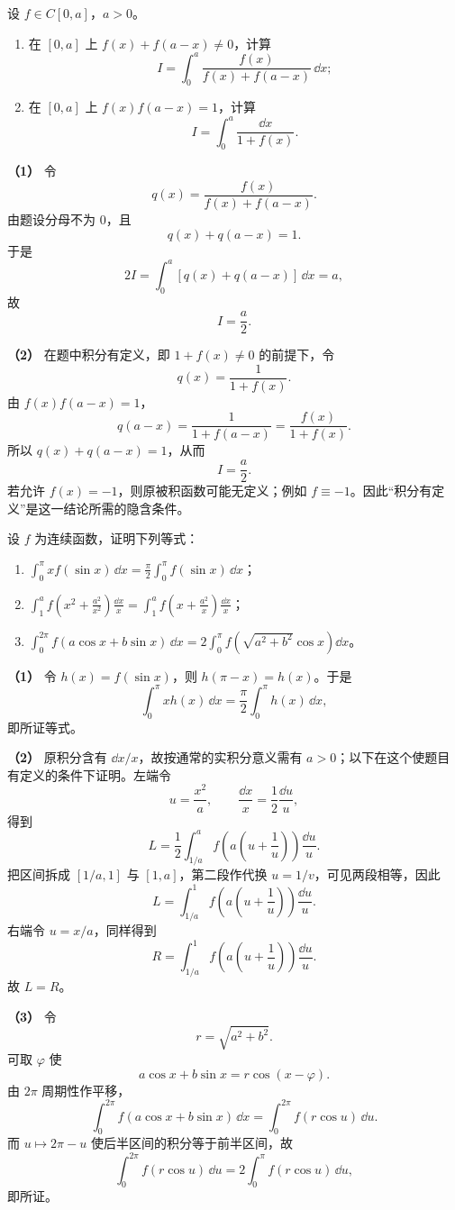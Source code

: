 \begin{xexercise}[4]
设 $f\in C[0,a]$，$a>0$。
\begin{enumerate}[label=(\arabic*)]
  \item 在 $[0,a]$ 上 $f(x)+f(a-x)\ne0$，计算
  \[
    I=\int_0^a\frac{f(x)}{f(x)+f(a-x)}\,\dd x;
  \]
  \item 在 $[0,a]$ 上 $f(x)f(a-x)=1$，计算
  \[
    I=\int_0^a\frac{\dd x}{1+f(x)}.
  \]
\end{enumerate}
\end{xexercise}
\begin{xsolution}
\textbf{（1）}\quad
令
\[
  q(x)=\frac{f(x)}{f(x)+f(a-x)}.
\]
由题设分母不为 $0$，且
\[
  q(x)+q(a-x)=1.
\]
于是
\[
  2I=\int_0^a[q(x)+q(a-x)]\,\dd x=a,
\]
故
\[
  \boxed{I=\frac a2}.
\]

\textbf{（2）}\quad
在题中积分有定义，即 $1+f(x)\ne0$ 的前提下，令
\[
  q(x)=\frac1{1+f(x)}.
\]
由 $f(x)f(a-x)=1$，
\[
  q(a-x)=\frac1{1+f(a-x)}
  =\frac{f(x)}{1+f(x)}.
\]
所以 $q(x)+q(a-x)=1$，从而
\[
  \boxed{I=\frac a2}.
\]
若允许 $f(x)=-1$，则原被积函数可能无定义；例如 $f\equiv-1$。因此“积分有定义”是这一结论所需的隐含条件。
\end{xsolution}


\begin{xexercise}[5]
设 $f$ 为连续函数，证明下列等式：
\begin{enumerate}[label=(\arabic*)]
  \item $\displaystyle\int_0^\pi x f(\sin x)\,\dd x=\frac\pi2\int_0^\pi f(\sin x)\,\dd x$；
  \item $\displaystyle\int_1^a f\left(x^2+\frac{a^2}{x^2}\right)\frac{\dd x}{x}=\int_1^a f\left(x+\frac{a^2}{x}\right)\frac{\dd x}{x}$；
  \item $\displaystyle\int_0^{2\pi}f(a\cos x+b\sin x)\,\dd x=2\int_0^\pi f\left(\sqrt{a^2+b^2}\cos x\right)\dd x$。
\end{enumerate}
\end{xexercise}
\begin{xsolution}
\textbf{（1）}\quad
令 $h(x)=f(\sin x)$，则 $h(\pi-x)=h(x)$。于是
\[
  \int_0^\pi xh(x)\,\dd x
  =\frac\pi2\int_0^\pi h(x)\,\dd x,
\]
即所证等式。

\textbf{（2）}\quad
原积分含有 $\dd x/x$，故按通常的实积分意义需有 $a>0$；以下在这个使题目有定义的条件下证明。左端令
\[
  u=\frac{x^2}{a},
  \qquad
  \frac{\dd x}{x}=\frac12\frac{\dd u}{u},
\]
得到
\[
  L=\frac12\int_{1/a}^{a}f\left(a\left(u+\frac1u\right)\right)\frac{\dd u}{u}.
\]
把区间拆成 $[1/a,1]$ 与 $[1,a]$，第二段作代换 $u=1/v$，可见两段相等，因此
\[
  L=\int_{1/a}^{1}f\left(a\left(u+\frac1u\right)\right)\frac{\dd u}{u}.
\]
右端令 $u=x/a$，同样得到
\[
  R=\int_{1/a}^{1}f\left(a\left(u+\frac1u\right)\right)\frac{\dd u}{u}.
\]
故 $L=R$。

\textbf{（3）}\quad
令
\[
  r=\sqrt{a^2+b^2}.
\]
可取 $\varphi$ 使
\[
  a\cos x+b\sin x=r\cos(x-\varphi).
\]
由 $2\pi$ 周期性作平移，
\[
  \int_0^{2\pi}f(a\cos x+b\sin x)\,\dd x
  =\int_0^{2\pi}f(r\cos u)\,\dd u.
\]
而 $u\mapsto2\pi-u$ 使后半区间的积分等于前半区间，故
\[
  \int_0^{2\pi}f(r\cos u)\,\dd u
  =2\int_0^\pi f(r\cos u)\,\dd u,
\]
即所证。
\end{xsolution}



